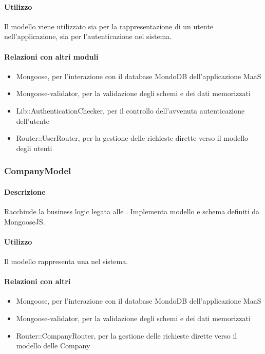 \paragraph*{Utilizzo}
Il modello viene utilizzato sia per la rappresentazione di un utente nell'applicazione, sia per l'autenticazione nel sistema.

\paragraph*{Relazioni con altri moduli}
\begin{itemize}
\item Mongoose, per l'interazione con il database MondoDB dell'applicazione MaaS
\item Mongoose-validator, per la validazione degli schemi e dei dati memorizzati
\item Lib::AuthenticationChecker, per il controllo dell'avvenuta autenticazione dell'utente
\item Router::UserRouter, per la gestione delle richieste dirette verso il modello degli utenti
\end{itemize}

\subsubsection{CompanyModel}
\paragraph*{Descrizione}
Racchiude la business logic legata alle . Implementa modello e schema definiti da MongooseJS.

\paragraph*{Utilizzo}
Il modello rappresenta una  nel sistema.

\paragraph*{Relazioni con altri }
\begin{itemize}
\item Mongoose, per l'interazione con il database MondoDB dell'applicazione MaaS
\item Mongoose-validator, per la validazione degli schemi e dei dati memorizzati
\item Router::CompanyRouter, per la gestione delle richieste dirette verso il modello delle Company
\end{itemize}

